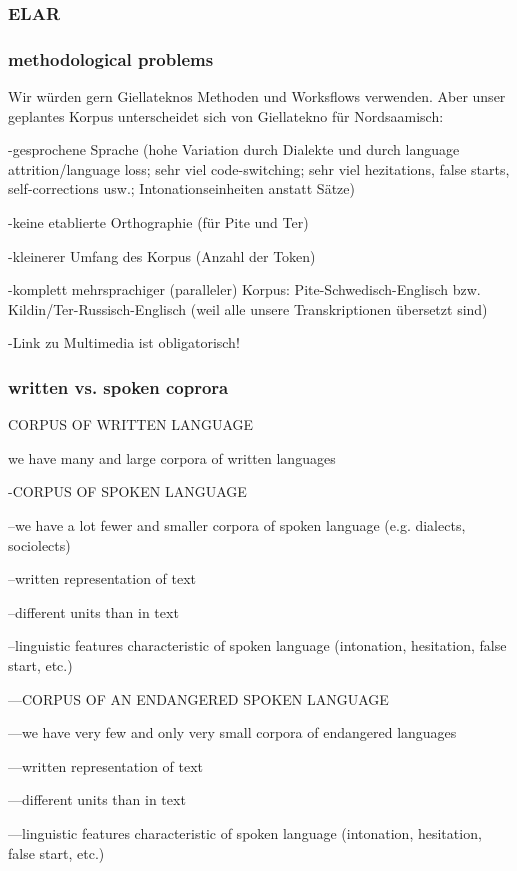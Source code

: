 \documentclass[a4paper,12pt]{article}
\begin{document}
\subsubsection{ELAR}

\subsubsection{methodological problems}

Wir würden gern Giellateknos Methoden und Worksflows verwenden. Aber unser geplantes Korpus unterscheidet sich von Giellatekno für Nordsaamisch:

-gesprochene Sprache (hohe Variation durch Dialekte und durch language attrition/language loss; sehr viel code-switching; sehr viel hezitations, false starts, self-corrections usw.; Intonationseinheiten anstatt Sätze)

-keine etablierte Orthographie (für Pite und Ter)

-kleinerer Umfang des Korpus (Anzahl der Token)

-komplett mehrsprachiger (paralleler) Korpus: Pite-Schwedisch-Englisch bzw. Kildin/Ter-Russisch-Englisch (weil alle unsere Transkriptionen übersetzt sind)

-Link zu Multimedia ist obligatorisch!


\subsubsection{written vs. spoken coprora} 
CORPUS OF WRITTEN LANGUAGE

we have many and large corpora of written languages

-CORPUS OF SPOKEN LANGUAGE

--we have a lot fewer and smaller corpora of spoken language (e.g. dialects, sociolects)

--written representation of text

--different units than in text

--linguistic features characteristic of spoken language (intonation, hesitation, false start, etc.)

---CORPUS OF AN ENDANGERED SPOKEN LANGUAGE

---we have very few and only very small corpora of endangered languages

---written representation of text

---different units than in text

---linguistic features characteristic of spoken language (intonation, hesitation, false start, etc.)
\end{document}
